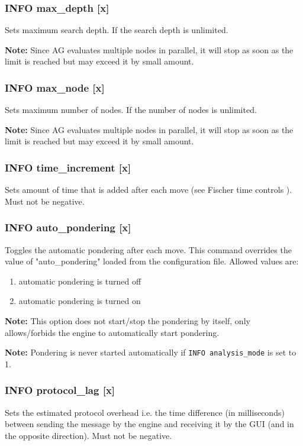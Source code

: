 \documentclass[12pt,a4paper]{article}
\begin{document}
\subsubsection{INFO max{\_}depth [x]}
Sets maximum search depth. If  the search depth is unlimited.

\textbf{Note:} Since AG evaluates multiple nodes in parallel, it will stop as soon as the limit is reached but may exceed it by small amount.

\subsubsection{INFO max{\_}node [x]}
Sets maximum number of nodes. If  the number of nodes is unlimited.

\textbf{Note:} Since AG evaluates multiple nodes in parallel, it will stop as soon as the limit is reached but may exceed it by small amount.

\subsubsection{INFO time{\_}increment [x]}
Sets amount of time that is added after each move (see Fischer time controls \cite{fischer}). Must not be negative.

\subsubsection{INFO auto{\_}pondering [x]}
Toggles the automatic pondering after each move. This command overrides the value of "auto{\_}pondering" loaded from the configuration file. Allowed values are:
\begin{enumerate}[leftmargin=7.5em]
	\item[\text{$[x]=0$}]{automatic pondering is turned off}
	\item[\text{$[x]=1$}]{automatic pondering is turned on}
\end{enumerate}

\textbf{Note:} This option does not start/stop the pondering by itself, only allows/forbids the engine to automatically start pondering.

\textbf{Note:} Pondering is never started automatically if \texttt{INFO analysis{\_}mode} is set to 1.

\subsubsection{INFO protocol{\_}lag [x]}
Sets the estimated protocol overhead i.e. the time difference (in milliseconds) between sending the message by the engine and receiving it by the GUI (and in the opposite direction). Must not be negative.
\end{document}
